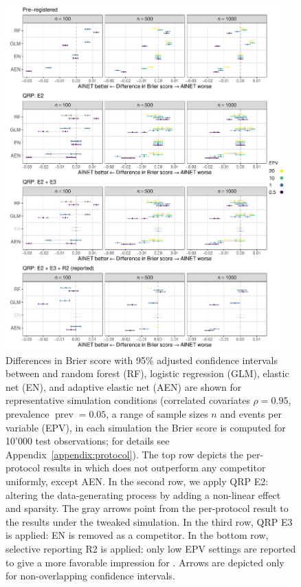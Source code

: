 \documentclass[a4paper, 11pt]{article}
\begin{document}
\begin{figure}[!htb]
  \centering
  \includegraphics[width = 0.96\textwidth]{ainet-results.pdf}
  \caption{Differences in Brier score with 95\% adjusted confidence intervals
    between \ainet{} and random forest (RF), 
    logistic regression (GLM), elastic net (EN), and adaptive elastic net (AEN)
    are shown for representative simulation conditions (correlated covariates 
    $\rho = 0.95$, prevalence $\operatorname{prev} = 0.05$, a range of sample sizes
    $n$ and events per variable (EPV), in each simulation the Brier score is computed 
    for 10'000 test observations; for details see Appendix~\ref{appendix:protocol}).
    The top row depicts the per-protocol results in which \ainet{} does not
    outperform any competitor uniformly, except AEN. In the second row, we apply
    QRP E2: altering the data-generating process by adding a non-linear effect and 
    sparsity. The gray arrows point from the per-protocol result to the results under 
    the tweaked simulation. In the third row, QRP E3 is applied: EN is removed as
    a competitor. In the bottom row, selective reporting R2 is applied: only low 
    EPV settings are reported to give a more favorable impression for \ainet{}.
    Arrows are depicted only for non-overlapping confidence intervals.
    } \label{fig:E1}
\end{figure}
\end{document}
